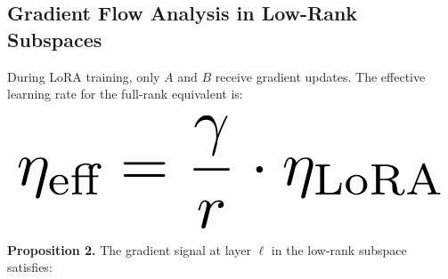 \documentclass[10pt,journal,compsoc,twocolumn]{IEEEtran}
\begin{document}
\subsection{Gradient Flow Analysis in Low-Rank Subspaces}


During LoRA training, only $A$ and $B$ receive gradient updates. The effective learning rate for the full-rank equivalent is:



























\begin{equation}
\resizebox{\columnwidth}{!}{$\displaystyle
\begin{aligned}
\eta_{\text{eff}} = \frac{\gamma}{r} \cdot \eta_{\text{LoRA}}
\end{aligned}
$}
\end{equation}



























\textbf{Proposition 2.} The gradient signal at layer $\ell$ in the low-rank subspace satisfies:
\end{document}
